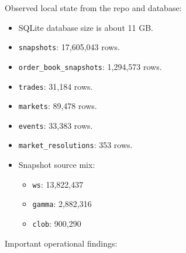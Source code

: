 \documentclass[
]{article}
\providecommand{\tightlist}{%
  \setlength{\itemsep}{0pt}\setlength{\parskip}{0pt}}
\begin{document}
Observed local state from the repo and database:

\begin{itemize}
\tightlist
\item
  SQLite database size is about 11 GB.
\item
  \texttt{snapshots}: 17,605,043 rows.
\item
  \texttt{order\_book\_snapshots}: 1,294,573 rows.
\item
  \texttt{trades}: 31,184 rows.
\item
  \texttt{markets}: 89,478 rows.
\item
  \texttt{events}: 33,383 rows.
\item
  \texttt{market\_resolutions}: 353 rows.
\item
  Snapshot source mix:

  \begin{itemize}
  \tightlist
  \item
    \texttt{ws}: 13,822,437
  \item
    \texttt{gamma}: 2,882,316
  \item
    \texttt{clob}: 900,290
  \end{itemize}
\end{itemize}

Important operational findings:
\end{document}
